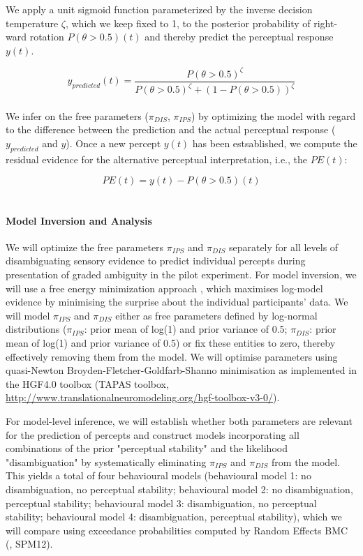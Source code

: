 \documentclass[12pt]{article}
\begin{document}
We apply a unit sigmoid function parameterized by the inverse decision temperature $\zeta$, which we keep fixed to 1, to the posterior probability of right-ward rotation $P(\theta>0.5)(t)$ and thereby predict the perceptual response $y(t)$. 

\begin{equation}
 y_{predicted}(t) = \frac{P(\theta > 0.5)^\zeta}{P(\theta > 0.5)^\zeta+(1-P(\theta > 0.5))^\zeta}
\end{equation} \\

We infer on the free parameters ($\pi_{DIS}$, $\pi_{IPS}$) by optimizing the model with regard to the difference between the prediction and the actual perceptual response ($y_{predicted}$ and $y$). Once a new percept $y(t)$ has been estsablished, we compute the residual evidence for the alternative perceptual interpretation, i.e., the $PE(t)$:

\begin{equation}
PE(t) = y(t) - P(\theta > 0.5)(t)
\end{equation}\\

\paragraph{Model Inversion and Analysis}

We will optimize the free parameters $\pi_{IPS}$ and $\pi_{DIS}$ separately for all levels of disambiguating sensory evidence to predict individual percepts during presentation of graded ambiguity in the pilot experiment. For model inversion, we will use a free energy minimization approach \parencite{Friston2007}, which maximises log-model evidence by minimising the surprise about the individual participants' data. We will model $\pi_{IPS}$ and $\pi_{DIS}$ either as free parameters defined by log-normal distributions ($\pi_{IPS}$: prior mean of log(1) and prior variance of 0.5; $\pi_{DIS}$: prior mean of log(1) and prior variance of 0.5) or fix these entities to zero, thereby effectively removing them from the model. We will optimise parameters using quasi-Newton Broyden-Fletcher-Goldfarb-Shanno minimisation as implemented in the HGF4.0 toolbox (TAPAS toolbox, \url{http://www.translationalneuromodeling.org/hgf-toolbox-v3-0/}).

For model-level inference, we will establish whether both parameters are relevant for the prediction of percepts and construct models incorporating all combinations of the prior "perceptual stability" and the likelihood "disambiguation" by systematically eliminating $\pi_{IPS}$ and $\pi_{DIS}$ from the model. This yields a total of four behavioural models (behavioural model 1: no disambiguation, no perceptual stability; behavioural model 2: no disambiguation, perceptual stability; behavioural model 3: disambiguation, no perceptual stability; behavioural model 4: disambiguation, perceptual stability), which we will compare using exceedance probabilities computed by Random Effects BMC (\cite{Stephan2009}, SPM12).
\end{document}

